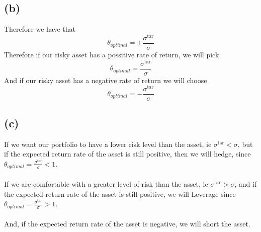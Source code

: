 \subsection*{(b)}
Therefore we have that 
$$\theta_{optimal}=\pm \frac{\sigma^{\text{tar}}}{\sigma}$$
Therefore if our risky asset has a possitive rate of return, we will pick
$$\theta_{optimal}=\boxed{\frac{\sigma^{\text{tar}}}{\sigma}}$$
And if our risky asset has a negative rate of return we will choose
$$\theta_{optimal}=\boxed{-\frac{\sigma^{\text{tar}}}{\sigma}}$$
\subsection*{(c)}
If we want our portfolio to have a lower risk level than the asset, ie $\sigma^{\text{tar}}<\sigma$,
but if the expected return rate of the asset is still positive, then we will hedge,
since $\theta_{optimal}=\frac{\sigma^{\text{tar}}}{\sigma}<1$.\\\\
If we are comfortable with a greater level of risk than the asset, ie $\sigma^{\text{tar}}>\sigma$, and
if the expected return rate of the asset is still positive, we will Leverage
since $\theta_{optimal}=\frac{\sigma^{\text{tar}}}{\sigma}>1$.\\\\
And, if the expected return rate of the asset is negative, we will short the asset.

